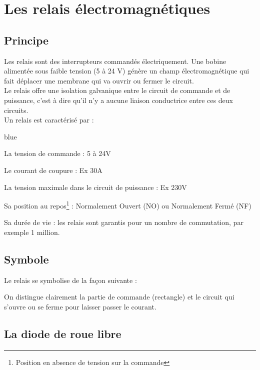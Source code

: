 \section{Les relais électromagnétiques}

\subsection{Principe}

Les relais sont des interrupteurs commandés électriquement. 
Une bobine alimentée sous faible tension (5 à 24 V) génère un champ électromagnétique qui fait déplacer une membrane qui va ouvrir ou fermer le circuit.\\

Le relais offre une isolation galvanique entre le circuit de commande et de puissance, c'est à dire qu'il n'y a aucune liaison conductrice entre ces deux circuits.\\

Un relais est caractérisé par :

\begin{items}{blue}{\Triangle}
  \item La tension de commande : 5 à 24V
  \item Le courant de coupure : Ex 30A
  \item La tension maximale dans le circuit de puissance : Ex 230V
  \item Sa position au repos\footnote{Position en absence de tension sur la commande} : Normalement Ouvert (NO) ou 
  Normalement Fermé (NF)
  \item Sa durée de vie : les relais sont garantis pour un nombre de commutation, par exemple 1 million.
\end{items}


\subsection{Symbole}

Le relais se symbolise de la façon suivante : 


On distingue clairement la partie de commande (rectangle) et le circuit qui s'ouvre ou se ferme pour laisser passer le courant.


\subsection{La diode de roue libre}

